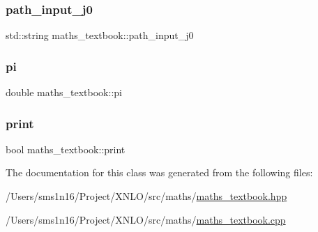 \mbox{\label{classmaths__textbook_a5c8a254bd117beaba43916c38f8f6a66}} 
\subsubsection{\texorpdfstring{path\_input\_j0}{path\_input\_j0}}
{\footnotesize\ttfamily std\+::string maths\+\_\+textbook\+::path\+\_\+input\+\_\+j0\hspace{0.3cm}{\ttfamily [private]}}

\mbox{\label{classmaths__textbook_a96b811ef2a81ca51b98cf2a10c8ac5bc}} 
\subsubsection{\texorpdfstring{pi}{pi}}
{\footnotesize\ttfamily double maths\+\_\+textbook\+::pi}

\mbox{\label{classmaths__textbook_ae2a8fbebf9b44587f2d21df219c10812}} 
\subsubsection{\texorpdfstring{print}{print}}
{\footnotesize\ttfamily bool maths\+\_\+textbook\+::print}



The documentation for this class was generated from the following files\+:\begin{DoxyCompactItemize}
\item 
/\+Users/sms1n16/\+Project/\+X\+N\+L\+O/src/maths/\mbox{\hyperlink{maths__textbook_8hpp}{maths\+\_\+textbook.\+hpp}}\item 
/\+Users/sms1n16/\+Project/\+X\+N\+L\+O/src/maths/\mbox{\hyperlink{maths__textbook_8cpp}{maths\+\_\+textbook.\+cpp}}\end{DoxyCompactItemize}
